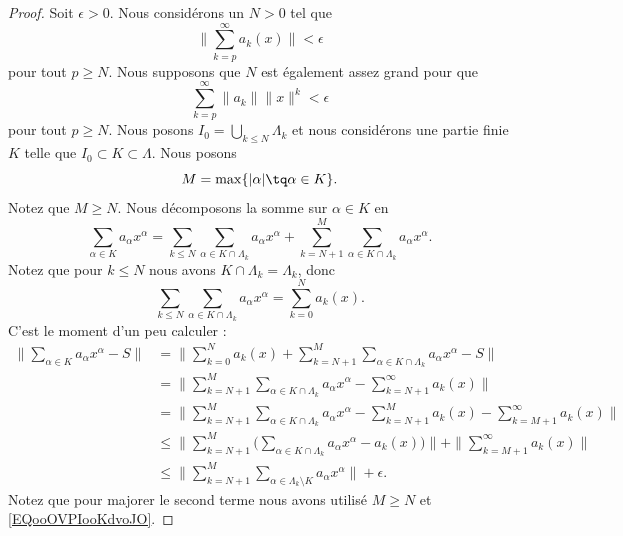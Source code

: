 \begin{proof}
	Soit \( \epsilon>0\). Nous considérons un \( N>0\) tel que
	\begin{equation}		\label{EQooOVPIooKdvoJO}
		\| \sum_{k=p}^{\infty}a_k(x) \|<\epsilon
	\end{equation}
	pour tout \( p\geq N\). Nous supposons que \( N\) est également assez grand pour que
	\begin{equation}		\label{EQooZTKGooFeKFXO}
		\sum_{k=p}^{\infty}\| a_k \|\| x \|^k<\epsilon
	\end{equation}
	pour tout \( p\geq N\).
	Nous posons \( I_0=\bigcup_{k\leq N}\Lambda_k\) et nous considérons une partie finie \( K\) telle que \( I_0\subset K\subset\Lambda\). Nous posons
	\begin{equation}
		M=\max\{ | \alpha |\tq \alpha\in K \}.
	\end{equation}
	Notez que \( M\geq N\). Nous décomposons la somme sur \( \alpha\in K\) en
	\begin{equation}
		\sum_{\alpha\in K}a_{\alpha}x^{\alpha}=\sum_{k\leq N}\sum_{\alpha\in K\cap \Lambda_k}a_{\alpha}x^{\alpha}+\sum_{k=N+1}^{M}\sum_{\alpha\in K\cap \Lambda_k}a_{\alpha}x^{\alpha}.
	\end{equation}
	Notez que pour \( k\leq N\) nous avons \( K\cap\Lambda_k=\Lambda_k\), donc
	\begin{equation}
		\sum_{k\leq N}\sum_{\alpha\in K\cap\Lambda_k}a_{\alpha}x^{\alpha}=\sum_{k=0}^Na_k(x).
	\end{equation}
	C'est le moment d'un peu calculer :
	\begin{subequations}		\label{SUBEQSooUJGQooXuWdDr}
		\begin{align}
			\| \sum_{\alpha\in K}a_{\alpha}x^{\alpha}-S \| & =\| \sum_{k=0}^Na_k(x)+\sum_{k=N+1}^M\sum_{\alpha\in K\cap \Lambda_k}a_{\alpha}x^{\alpha}-S \|                                    \\
			                                               & =\| \sum_{k=N+1}^M\sum_{\alpha\in K\cap \Lambda_k}a_{\alpha}x^{\alpha}-\sum_{k=N+1}^{\infty}a_k(x) \|                             \\
			                                               & =\| \sum_{k=N+1}^M\sum_{\alpha\in K\cap \Lambda_k}a_{\alpha}x^{\alpha}-\sum_{k=N+1}^{M}a_k(x)-\sum_{k=M+1}^{\infty}a_k(x) \|      \\
			                                               & \leq \| \sum_{k=N+1}^M\Big( \sum_{\alpha\in K\cap\Lambda_k}a_{\alpha}x^{\alpha}-a_k(x) \Big) \|+\| \sum_{k=M+1}^{\infty}a_k(x) \| \\
			                                               & \leq \| \sum_{k=N+1}^M\sum_{\alpha\in\Lambda_k\setminus K}a_{\alpha}x^{\alpha} \|+\epsilon.
		\end{align}
	\end{subequations}
	Notez que pour majorer le second terme nous avons utilisé \( M\geq N\) et \eqref{EQooOVPIooKdvoJO}.


\end{proof}
